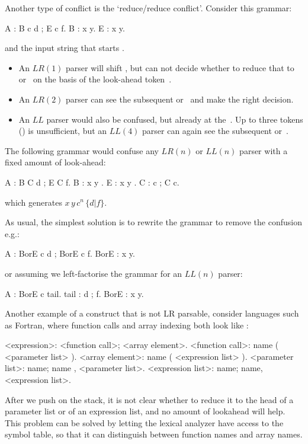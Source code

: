 Another type of conflict is the `reduce/reduce conflict'. Consider this grammar:
\begin{bnf}
A : B c d ; E c f.
  B : x y.
  E : x y.
\end{bnf}
and the input string that starts .
\begin{itemize}
\item An $LR(1)$ parser will shift , but can not decide whether
  to reduce that to  or~ on the basis of the look-ahead
  token~.
\item An $LR(2)$ parser can see the subsequent  or~ and make
  the right decision.
\item An $LL$ parser would also be confused, but already at
  the~. Up to three tokens () is unsufficient, but an
  $LL(4)$ parser can again see the  subsequent  or~.
\end{itemize}
The following grammar would confuse any $LR(n)$ or $LL(n)$ parser with a
fixed amount of look-ahead:
\begin{bnf}
  A : B C d ; E C f.
  B : x y .
  E : x y .
  C : c ; C c.
\end{bnf}
which generates $x\,y\,c^n\,\{d|f\}$.

As usual, the simplest solution is to rewrite the grammar to remove the confusion e.g.:
\begin{bnf}
  A    : BorE c d ; BorE c f.
  BorE : x y.
\end{bnf}
or assuming we left-factorise the grammar for an $LL(n)$ parser:
\begin{bnf}
  A    : BorE c tail.
  tail : d ; f.
  BorE : x y.
\end{bnf}

Another example of a construct that is not LR parsable, consider
languages such as Fortran, where function calls and array indexing
both look like :
\begin{bnf}
<expression>: <function call>; <array element>.
<function call>: name ( <parameter list> ).
<array element>: name ( <expression list> ).
<parameter list>: name; name , <parameter list>.
<expression list>: name; name, <expression list>.
\end{bnf}
After we push  on the stack, it is not clear whether to reduce it
to the head of a parameter list or of an expression list, and no
amount of lookahead will help. This problem can be solved by letting
the lexical analyzer have access to the symbol table, so that it can
distinguish between function names and array names.

